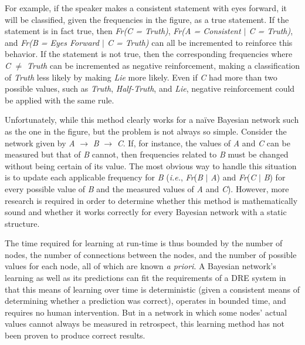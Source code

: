 \documentclass[conference]{IEEEtran}
\begin{document}
For example, if the speaker makes a consistent statement with eyes forward, it will be classified, given the frequencies in the figure, as a true statement. If the statement is in fact true, then \emph{Fr(C = Truth)}, \emph{Fr(A = Consistent $|$ C = Truth)}, and \emph{Fr(B = Eyes Forward $|$ C = Truth)} can all be incremented to reinforce this behavior. If the statement is not true, then the corresponding frequencies where \emph{C} $\neq$ \emph{Truth} can be incremented as negative reinforcement, making a classification of \emph{Truth} less likely by making \emph{Lie} more likely. Even if \emph{C} had more than two possible values, such as \emph{Truth}, \emph{Half-Truth}, and \emph{Lie}, negative reinforcement could be applied with the same rule.

Unfortunately, while this method clearly works for a na\"{i}ve Bayesian network such as the one in the figure, but the problem is not always so simple. Consider the network given by \emph{A} $\rightarrow$ \emph{B} $\rightarrow$ \emph{C}. If, for instance, the values of \emph{A} and \emph{C} can be measured but that of \emph{B} cannot, then frequencies related to \emph{B} must be changed without being certain of its value. The most obvious way to handle this situation is to update each applicable frequency for \emph{B} (\emph{i.e.}, \emph{Fr}(\emph{B} $|$ \emph{A}) and \emph{Fr}(\emph{C} $|$ \emph{B}) for every possible value of \emph{B} and the measured values of \emph{A} and \emph{C}). However, more research is required in order to determine whether this method is mathematically sound and whether it works correctly for every Bayesian network with a static structure.

%

	The time required for learning at run-time is thus bounded by the number of nodes, the number of connections between the nodes, and the number of possible values for each node, all of which are known \emph{a priori}. A Bayesian network's learning as well as its predictions can fit the requirements of a DRE system in that this means of learning over time is deterministic (given a consistent means of determining whether a prediction was correct), operates in bounded time, and requires no human intervention. But in a network in which some nodes' actual values cannot always be measured in retrospect, this learning method has not been proven to produce correct results.
\end{document}
